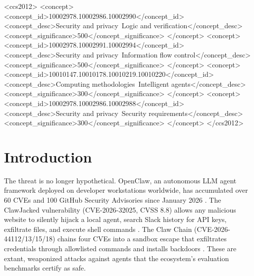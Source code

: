 \documentclass[manuscript,screen,review,anonymous]{acmart}
\begin{document}
\begin{abstract}
Canary-based obfuscation detection closes a measured evasion gap, raising evasion recall from 0.33 to 1.0 on a six-variant encoding probe. SafeLattice increases effective safety coverage from 19\% to 28\% of the benchmark's task space.
\end{abstract}

\begin{CCSXML}
<ccs2012>
<concept>
<concept_id>10002978.10002986.10002990</concept_id>
<concept_desc>Security and privacy~Logic and verification</concept_desc>
<concept_significance>500</concept_significance>
</concept>
<concept>
<concept_id>10002978.10002991.10002994</concept_id>
<concept_desc>Security and privacy~Information flow control</concept_desc>
<concept_significance>500</concept_significance>
</concept>
<concept>
<concept_id>10010147.10010178.10010219.10010220</concept_id>
<concept_desc>Computing methodologies~Intelligent agents</concept_desc>
<concept_significance>300</concept_significance>
</concept>
<concept>
<concept_id>10002978.10002986.10002988</concept_id>
<concept_desc>Security and privacy~Security requirements</concept_desc>
<concept_significance>300</concept_significance>
</concept>
</ccs2012>
\end{CCSXML}



\maketitle

\section{Introduction}
\label{sec:intro}

The threat is no longer hypothetical. OpenClaw, an autonomous LLM agent framework deployed on developer workstations worldwide, has accumulated over 60 CVEs and 100 GitHub Security Advisories since January 2026 \cite{openclawvulntaxonomy2026}. The ClawJacked vulnerability (CVE-2026-32025, CVSS 8.8) allows any malicious website to silently hijack a local agent, search Slack history for API keys, exfiltrate files, and execute shell commands \cite{clawjacked2026}. The Claw Chain (CVE-2026-44112/13/15/18) chains four CVEs into a sandbox escape that exfiltrates credentials through allowlisted commands and installs backdoors \cite{clawchain2026}. These are extant, weaponized attacks against agents that the ecosystem's evaluation benchmarks certify as safe.
\end{document}
